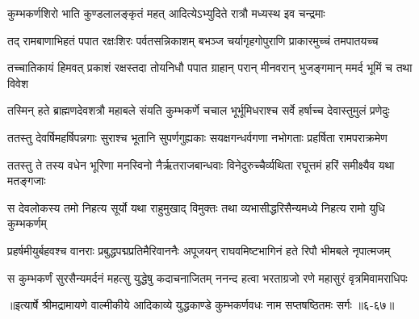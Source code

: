 \twolineshloka
{कुम्भकर्णशिरो भाति कुण्डलालङ्कृतं महत्}
{आदित्येऽभ्युदिते रात्रौ मध्यस्थ इव चन्द्रमाः} %

\twolineshloka
{तद् रामबाणाभिहतं पपात रक्षःशिरः पर्वतसन्निकाशम्}
{बभञ्ज चर्यागृहगोपुराणि प्राकारमुच्चं तमपातयच्च} %

\twolineshloka
{तच्चातिकायं हिमवत् प्रकाशं रक्षस्तदा तोयनिधौ पपात}
{ग्राहान् परान् मीनवरान् भुजङ्गमान् ममर्द भूमिं च तथा विवेश} %

\twolineshloka
{तस्मिन् हते ब्राह्मणदेवशत्रौ महाबले संयति कुम्भकर्णे}
{चचाल भूर्भूमिधराश्च सर्वे हर्षाच्च देवास्तुमुलं प्रणेदुः} %

\twolineshloka
{ततस्तु देवर्षिमहर्षिपन्नगाः सुराश्च भूतानि सुपर्णगुह्यकाः}
{सयक्षगन्धर्वगणा नभोगताः प्रहर्षिता रामपराक्रमेण} %

\twolineshloka
{ततस्तु ते तस्य वधेन भूरिणा मनस्विनो नैर्ऋतराजबान्धवाः}
{विनेदुरुच्चैर्व्यथिता रघूत्तमं हरिं समीक्ष्यैव यथा मतङ्गजाः} %

\twolineshloka
{स देवलोकस्य तमो निहत्य सूर्यो यथा राहुमुखाद् विमुक्तः}
{तथा व्यभासीद्धरिसैन्यमध्ये निहत्य रामो युधि कुम्भकर्णम्} %

\twolineshloka
{प्रहर्षमीयुर्बहवश्च वानराः प्रबुद्धपद्मप्रतिमैरिवाननैः}
{अपूजयन् राघवमिष्टभागिनं हते रिपौ भीमबले नृपात्मजम्} %

\twolineshloka
{स कुम्भकर्णं सुरसैन्यमर्दनं महत्सु युद्धेषु कदाचनाजितम्}
{ननन्द हत्वा भरताग्रजो रणे महासुरं वृत्रमिवामराधिपः} %


॥इत्यार्षे श्रीमद्रामायणे वाल्मीकीये आदिकाव्ये युद्धकाण्डे कुम्भकर्णवधः नाम सप्तषष्ठितमः सर्गः ॥६-६७॥
